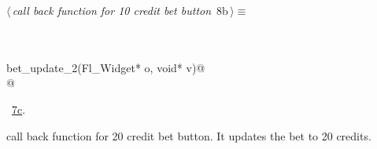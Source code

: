 \documentclass{article}
\renewcommand{\NWtarget}[2]{\hypertarget{#1}{#2}}
\renewcommand{\NWlink}[2]{\hyperlink{#1}{#2}}
\begin{document}
\begin{flushleft} \small
\begin{minipage}{\linewidth}\label{scrap11}\raggedright\small
\NWtarget{nuweb8b}{} $\langle\,${\it call back function for 10 credit bet button}\nobreak\ {\footnotesize {8b}}$\,\rangle\equiv$
\vspace{-1ex}
\begin{list}{}{} \item
\mbox{}\verb@@\\
\mbox{}\verb@@\\
\mbox{}\verb@void bet_update_2(Fl_Widget* o, void* v)@\\
\mbox{}@\\
\mbox{}\verb@@{\NWsep}
\end{list}
\vspace{-1.5ex}
\footnotesize
\begin{list}{}{\setlength{\itemsep}{-\parsep}\setlength{\itemindent}{-\leftmargin}}
\item \NWtxtMacroRefIn\ \NWlink{nuweb7c}{7c}.

\item{}
\end{list}
\end{minipage}\vspace{4ex}
\end{flushleft}
call back function for 20 credit bet button. It updates the bet to 20 credits.
\end{document}
